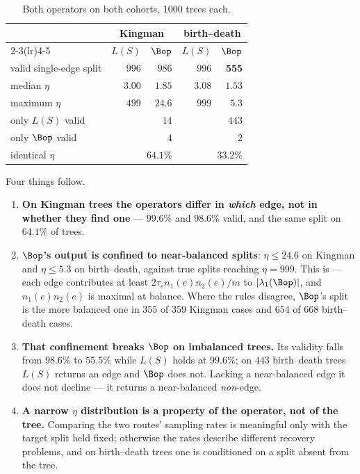\begin{table}[htbp]
\centering
\caption{Both operators on both cohorts, 1000 trees each.}
\label{tab:eta-agreement}
\begin{tabular}{lrrrr}
\toprule
& \multicolumn{2}{c}{Kingman} & \multicolumn{2}{c}{birth--death}\\
\cmidrule(lr){2-3}\cmidrule(lr){4-5}
& $L(S)$ & $\Bop$ & $L(S)$ & $\Bop$\\
\midrule
valid single-edge split & $996$ & $986$ & $996$ & $\mathbf{555}$\\
median $\eta$           & $3.00$ & $1.85$ & $3.08$ & $1.53$\\
maximum $\eta$          & $499$  & $24.6$ & $999$  & $5.3$\\
\midrule
only $L(S)$ valid       & \multicolumn{2}{r}{$14$}  & \multicolumn{2}{r}{$443$}\\
only $\Bop$ valid       & \multicolumn{2}{r}{$4$}   & \multicolumn{2}{r}{$2$}\\
identical $\eta$        & \multicolumn{2}{r}{$64.1\%$} & \multicolumn{2}{r}{$33.2\%$}\\
\bottomrule
\end{tabular}
\end{table}

\noindent Four things follow.

\begin{enumerate}[leftmargin=2em, itemsep=3pt, topsep=3pt]
\item \textbf{On Kingman trees the operators differ in \emph{which} edge, not in whether
      they find one} --- $99.6\%$ and $98.6\%$ valid, and the same split on $64.1\%$ of
      trees.
\item \textbf{$\Bop$'s output is confined to near-balanced splits}: $\eta\le24.6$ on
      Kingman and $\eta\le5.3$ on birth--death, against true splits reaching $\eta=999$.
      This is  --- each edge contributes at least
      $2\tau_e n_1(e)n_2(e)/m$ to $|\lambda_1(\Bop)|$, and $n_1(e)n_2(e)$ is maximal at
      balance. Where the rules disagree, $\Bop$'s split is the more balanced one in $355$
      of $359$ Kingman cases and $654$ of $668$ birth--death cases.
\item \textbf{That confinement breaks $\Bop$ on imbalanced trees.} Its validity falls from
      $98.6\%$ to $55.5\%$ while $L(S)$ holds at $99.6\%$; on $443$ birth--death trees
      $L(S)$ returns an edge and $\Bop$ does not. Lacking a near-balanced edge it does not
      decline --- it returns a near-balanced \emph{non}-edge.
\item \textbf{A narrow $\eta$ distribution is a property of the operator, not of the
      tree.} Comparing the two routes' sampling rates is meaningful only with the target
      split held fixed; otherwise the rates describe different recovery problems, and on
      birth--death trees one is conditioned on a split absent from the tree.
\end{enumerate}
